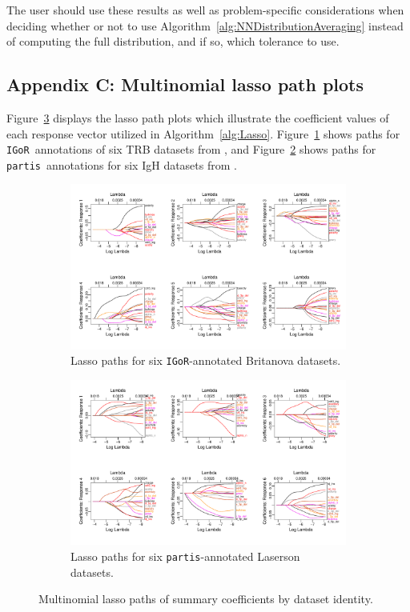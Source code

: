 \documentclass{article}
\newcommand{\partis}{\texttt{partis}}
\newcommand{\igor}{\texttt{IGoR}}
\begin{document}
The user should use these results as well as problem-specific considerations when deciding whether or not to use Algorithm~\ref{alg:NNDistributionAveraging} instead of computing the full distribution, and if so, which tolerance to use.

\subsection*{Appendix C: Multinomial lasso path plots}
Figure~\ref{fig:LassoPaths} displays the lasso path plots which illustrate the coefficient values of each response vector utilized in Algorithm~\ref{alg:Lasso}.
Figure~\ref{fig:IgorLassoPaths} shows paths for \igor\ annotations of six TRB datasets from \cite{Britanova2016-iw}, and Figure~\ref{fig:PartisLassoPaths} shows paths for \partis\ annotations for six IgH datasets from \cite{Laserson2014-dx}.
\begin{figure}
	\begin{subfigure}{\linewidth}
    	\includegraphics[width=\linewidth]{Figures/Lasso/igor_lasso_paths.pdf}
		\caption{Lasso paths for six \igor-annotated Britanova datasets.}
		\label{fig:IgorLassoPaths}
    \end{subfigure}
    \begin{subfigure}{\linewidth}
    	\includegraphics[width=\linewidth]{Figures/Lasso/partis_lasso_paths.pdf}
		\caption{Lasso paths for six \partis-annotated Laserson datasets.}
		\label{fig:PartisLassoPaths}
    \end{subfigure}
    \caption{Multinomial lasso paths of summary coefficients by dataset identity.}
    \label{fig:LassoPaths}
\end{figure}
\end{document}

